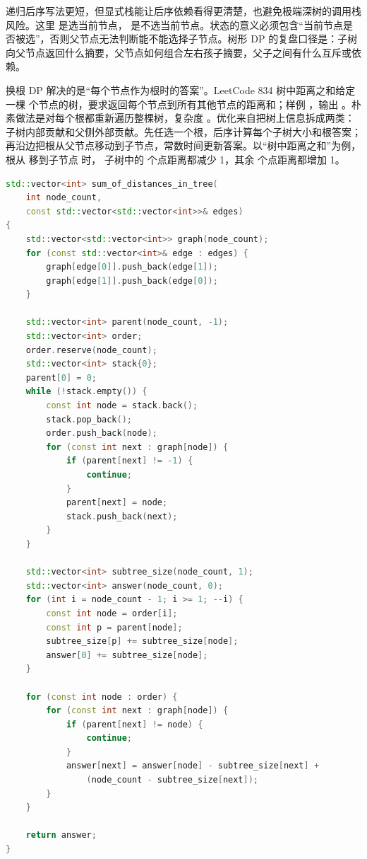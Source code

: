 递归后序写法更短，但显式栈能让后序依赖看得更清楚，也避免极端深树的调用栈风险。这里  是选当前节点， 是不选当前节点。状态的意义必须包含“当前节点是否被选”，否则父节点无法判断能不能选择子节点。树形 DP 的复盘口径是：子树向父节点返回什么摘要，父节点如何组合左右孩子摘要，父子之间有什么互斥或依赖。

换根 DP 解决的是“每个节点作为根时的答案”。LeetCode 834 树中距离之和给定一棵  个节点的树，要求返回每个节点到所有其他节点的距离和；样例 ，输出 \code{[8,12,6,10,10,10]}。朴素做法是对每个根都重新遍历整棵树，复杂度 。优化来自把树上信息拆成两类：子树内部贡献和父侧外部贡献。先任选一个根，后序计算每个子树大小和根答案；再沿边把根从父节点移动到子节点，常数时间更新答案。以“树中距离之和”为例，根从  移到子节点  时， 子树中的  个点距离都减少 1，其余  个点距离都增加 1。

\begin{lstlisting}[language=C++,caption={LeetCode 834 树中距离之和：两遍迭代换根 DP}]
std::vector<int> sum_of_distances_in_tree(
    int node_count,
    const std::vector<std::vector<int>>& edges)
{
    std::vector<std::vector<int>> graph(node_count);
    for (const std::vector<int>& edge : edges) {
        graph[edge[0]].push_back(edge[1]);
        graph[edge[1]].push_back(edge[0]);
    }

    std::vector<int> parent(node_count, -1);
    std::vector<int> order;
    order.reserve(node_count);
    std::vector<int> stack{0};
    parent[0] = 0;
    while (!stack.empty()) {
        const int node = stack.back();
        stack.pop_back();
        order.push_back(node);
        for (const int next : graph[node]) {
            if (parent[next] != -1) {
                continue;
            }
            parent[next] = node;
            stack.push_back(next);
        }
    }

    std::vector<int> subtree_size(node_count, 1);
    std::vector<int> answer(node_count, 0);
    for (int i = node_count - 1; i >= 1; --i) {
        const int node = order[i];
        const int p = parent[node];
        subtree_size[p] += subtree_size[node];
        answer[0] += subtree_size[node];
    }

    for (const int node : order) {
        for (const int next : graph[node]) {
            if (parent[next] != node) {
                continue;
            }
            answer[next] = answer[node] - subtree_size[next] +
                (node_count - subtree_size[next]);
        }
    }

    return answer;
}
\end{lstlisting}

